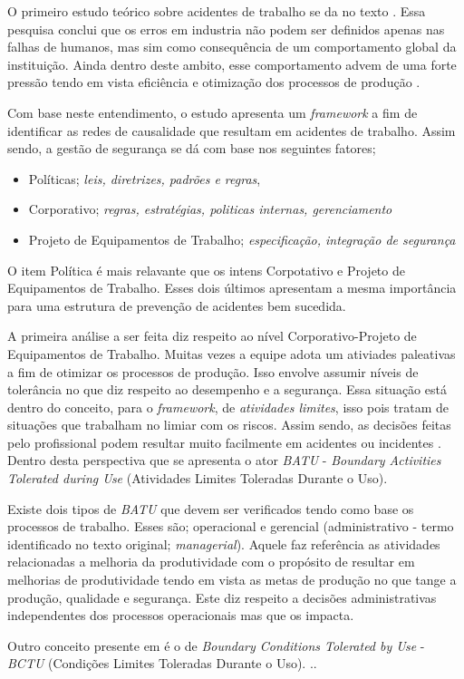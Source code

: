 
O primeiro estudo teórico sobre acidentes de trabalho se da no texto \cite{riskoldschool}. Essa pesquisa conclui que os erros em industria não podem ser definidos apenas nas falhas de 
humanos, mas sim como consequência de um comportamento global da instituição. Ainda dentro deste ambito, esse comportamento advem de uma forte pressão tendo em vista eficiência e otimização 
dos processos de produção \cite{riskoldschool} \cite{safety}.

Com base neste entendimento, o estudo \cite{safety} apresenta um \textit{framework} a fim de identificar as redes de causalidade que resultam em acidentes de trabalho. Assim sendo, a gestão de 
segurança se dá com base nos seguintes fatores; 
\begin{itemize}
    \item Políticas; \textit{leis, diretrizes, padrões e regras},
    \item Corporativo; \textit{regras, estratégias, politicas internas, gerenciamento}
    \item Projeto de Equipamentos de Trabalho; \textit{especificação, integração de segurança}
\end{itemize}

O item Política é mais relavante que os intens Corpotativo e Projeto de Equipamentos de Trabalho. Esses dois últimos apresentam a mesma importância para uma estrutura de prevenção de acidentes 
bem sucedida. 

A primeira análise a ser feita diz respeito ao nível Corporativo-Projeto de Equipamentos de Trabalho. Muitas vezes a equipe adota um ativiades paleativas a fim de otimizar os processos 
de produção. Isso envolve assumir níveis de tolerância no que diz respeito ao desempenho e a segurança. Essa situação está dentro do conceito, para o \textit{framework}, de \textit{atividades
limites}, isso pois tratam de situações que trabalham no limiar com os riscos. Assim sendo, as decisões feitas pelo profissional podem resultar muito facilmente em acidentes ou incidentes \cite{safety}. 
Dentro desta perspectiva que se apresenta o ator \textit{BATU} - \textit{Boundary Activities Tolerated during Use} (Atividades Limites Toleradas Durante o Uso).

Existe dois tipos de \textit{BATU} que devem ser verificados tendo como base os processos de trabalho. Esses são; operacional e gerencial (administrativo - termo identificado no texto 
original; \textit{managerial}). Aquele faz referência as atividades relacionadas a melhoria da produtividade com o propósito de resultar em melhorias de produtividade tendo em vista as metas
de produção no que tange a produção, qualidade e segurança. Este diz respeito a decisões administrativas independentes dos processos operacionais mas que os impacta.

Outro conceito presente em \cite{safety} é o de \textit{Boundary Conditions Tolerated by Use} - \textit{BCTU} (Condições Limites Toleradas Durante o Uso). ..


